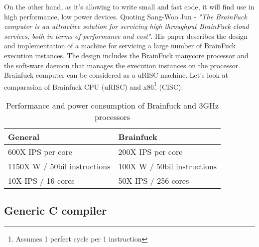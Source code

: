 \documentclass{article}
\begin{document}
\par On the other hand, as it's allowing to write small and fast code, it will find use in high performance, low power devices. Quoting Sang-Woo Jun - \textit{"The BrainFuck computer is an attractive solution for servicing high throughput BrainFuck cloud services, both in terms of performance and cost"}. His paper describes the design and implementation of a machine for servicing a large number of BrainFuck execution instances. The design  includes  the  BrainFuck  manycore  processor  and  the  soft-ware daemon that manages the execution instances on the processor. Brainfuck computer can be considered as a uRISC machine. Let's look at comparasion of Brainfuck CPU (uRISC) and x86\footnote{Assumes 1 perfect cycle per 1 instruction} (CISC):

\begin{table}[h]
\centering
\caption{Performance and power consumption of Brainfuck and 3GHz processors}
\label{tab:instropcom}
\begin{tabular}{|l|l|}
\hline
\textbf{General} & \textbf{Brainfuck} \\ \hline
600X IPS per core & 200X IPS per core \\ \hline
1150X W / 50bil instructions & 100X W / 50bil instructions \\ \hline
10X IPS / 16 cores & 50X IPS / 256 cores \\ \hline
\end{tabular}
\end{table}

\subsection{Generic C compiler}
\end{document}
